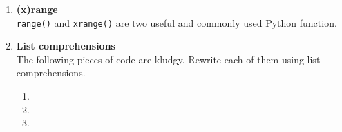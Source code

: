\documentclass{article}
\newcounter{points}
\newcommand\printpoints{Total number of points: \thepoints}
\begin{document}
\pagestyle{fancy}
\begin{enumerate}

\item \textbf{(x)range} \\
\texttt{range()} and \texttt{xrange()} are two useful and commonly used Python function.  

\item \textbf{List comprehensions} \\
The following pieces of code are kludgy.  Rewrite each of them using list comprehensions.

\begin{enumerate}
\item 
\end{enumerate}

\begin{enumerate}
\setcounter{enumii}{1}
\item 
\end{enumerate}

\begin{enumerate}
\setcounter{enumii}{2}
\item 
\end{enumerate}



\end{enumerate}
\end{document}
